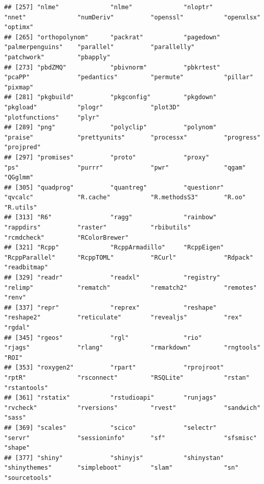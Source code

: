 \documentclass[
  12pt,
]{book}
\begin{document}
\begin{verbatim}
## [257] "nlme"              "nlme"              "nloptr"            "nnet"              "numDeriv"          "openssl"           "openxlsx"          "optimx"           
## [265] "orthopolynom"      "packrat"           "pagedown"          "palmerpenguins"    "parallel"          "parallelly"        "patchwork"         "pbapply"          
## [273] "pbdZMQ"            "pbivnorm"          "pbkrtest"          "pcaPP"             "pedantics"         "permute"           "pillar"            "pixmap"           
## [281] "pkgbuild"          "pkgconfig"         "pkgdown"           "pkgload"           "plogr"             "plot3D"            "plotfunctions"     "plyr"             
## [289] "png"               "polyclip"          "polynom"           "praise"            "prettyunits"       "processx"          "progress"          "projpred"         
## [297] "promises"          "proto"             "proxy"             "ps"                "purrr"             "pwr"               "qgam"              "QGglmm"           
## [305] "quadprog"          "quantreg"          "questionr"         "qvcalc"            "R.cache"           "R.methodsS3"       "R.oo"              "R.utils"          
## [313] "R6"                "ragg"              "rainbow"           "rappdirs"          "raster"            "rbibutils"         "rcmdcheck"         "RColorBrewer"     
## [321] "Rcpp"              "RcppArmadillo"     "RcppEigen"         "RcppParallel"      "RcppTOML"          "RCurl"             "Rdpack"            "readbitmap"       
## [329] "readr"             "readxl"            "registry"          "relimp"            "rematch"           "rematch2"          "remotes"           "renv"             
## [337] "repr"              "reprex"            "reshape"           "reshape2"          "reticulate"        "revealjs"          "rex"               "rgdal"            
## [345] "rgeos"             "rgl"               "rio"               "rjags"             "rlang"             "rmarkdown"         "rngtools"          "ROI"              
## [353] "roxygen2"          "rpart"             "rprojroot"         "rptR"              "rsconnect"         "RSQLite"           "rstan"             "rstantools"       
## [361] "rstatix"           "rstudioapi"        "runjags"           "rvcheck"           "rversions"         "rvest"             "sandwich"          "sass"             
## [369] "scales"            "scico"             "selectr"           "servr"             "sessioninfo"       "sf"                "sfsmisc"           "shape"            
## [377] "shiny"             "shinyjs"           "shinystan"         "shinythemes"       "simpleboot"        "slam"              "sn"                "sourcetools"      

\end{verbatim}
\end{document}
